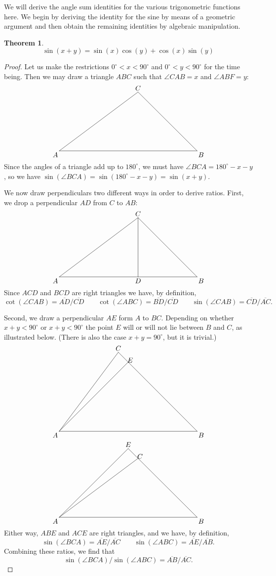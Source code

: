 \documentclass[12pt]{article}
\newtheorem{thm}{Theorem}
\begin{document}
We will derive the angle sum identities for the various trigonometric
functions here.  We begin by deriving the identity for the sine by means 
of a geometric argument and then obtain the remaining identities by
algebraic manipulation.

\begin{thm}
\[
\sin (x + y) = \sin (x) \cos (y) + \cos (x) \sin (y)
\]
\end{thm}

\begin{proof}
Let us make the restrictions $0^\circ < x < 90^\circ$ and 
$0^\circ < y < 90^\circ$ for the time being.  Then we may draw a
triangle $ABC$ such that $\angle CAB = x$ and $\angle ABF = y$:
\[
\begin{xy}
,(0,0)
;(70,0)**@{-}
;(40,30)**@{-}
;(0,0)**@{-}
,(-2,-2)*{A}
,(72,-2)*{B}
,(40,32)*{C}
\end{xy}
\]
Since the angles of a triangle add up to $180^\circ$, we must have
$\angle BCA = 180^\circ - x - y$, so we have $\sin (\angle BCA) =
\sin (180^\circ - x - y) = \sin (x + y)$.

We now draw perpendiculars two different ways in order to derive ratios.
First, we drop a perpendicular $AD$ from $C$ to $AB$:
\[
\begin{xy}
,(0,0)
;(70,0)**@{-}
;(40,30)**@{-}
;(0,0)**@{-}
,(40,30)
;(40,0)**@{-}
,(-2,-2)*{A}
,(72,-2)*{B}
,(40,32)*{C}
,(40,-2)*{D}
\end{xy}
\]
Since $ACD$ and $BCD$ are right triangles we have, by definition,
\[
\cot (\angle CAB) = \overline{AD} / \overline{CD} \qquad
\cot (\angle ABC) = \overline{BD} / \overline{CD} \qquad
\sin (\angle CAB) = \overline{CD} / \overline{AC} .
\]

Second, we draw a perpendicular $AE$ form $A$ to $BC$.  Depending on whether
$x+y < 90^\circ$ or $x+y < 90^\circ$ the point $E$ will or will not lie between
$B$ and $C$, as illustrated below.  (There is also the case $x+y = 90^\circ$, 
but it is trivial.)
\[
\begin{xy}
,(0,0)
;(70,0)**@{-}
;(30,40)**@{-}
;(0,0)**@{-}
,(0,0)
;(35,35)**@{-}
,(-2,-2)*{A}
,(72,-2)*{B}
,(30,42)*{C}
,(36,36)*{E}
\end{xy}
\]
\[
\begin{xy}
,(0,0)
;(70,0)**@{-}
;(35,35)**@{-}
;(0,0)**@{-}
,(0,0)
;(40,30)**@{-}
,(-2,-2)*{A}
,(72,-2)*{B}
,(41,31)*{C}
,(35,37)*{E}
\end{xy}
\]
Either way, $ABE$ and $ACE$ are right triangles, and we have, by definition,
\[
\sin (\angle BCA) = \overline{AE} / \overline{AC} \qquad
\sin (\angle ABC) = \overline{AE} / \overline{AB} .
\]
Combining these ratios, we find that
\[
\sin (\angle BCA) / \sin (\angle ABC) = \overline{AB} / \overline{AC} .
\]


\end{proof}
\end{document}
